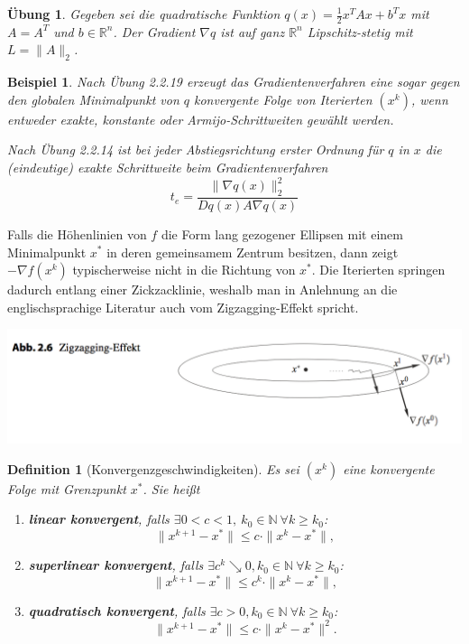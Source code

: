 \documentclass[11pt]{scrreprt}
\newcounter{thm}
\theoremstyle{thmstyle}
\numberwithin{thm}{section}
\newtheorem{beispiel}[thm]{Beispiel}
\newtheorem{definition}[thm]{Definition}
\newtheorem{uebung}[thm]{Übung}
\begin{document}
\begin{uebung}
	Gegeben sei die quadratische Funktion $q(x) = \frac{1}{2} x^T A x + b^T x$ mit $A = A^T$ und $b \in \mathbb{R}^n$. Der Gradient $\nabla q$ ist auf ganz $\mathbb{R}^n$ Lipschitz-stetig mit $L = \| A \|_2$. 
\end{uebung}

\begin{beispiel}
	Nach Übung 2.2.19 erzeugt das Gradientenverfahren eine sogar gegen den globalen Minimalpunkt von $q$ konvergente Folge von Iterierten $(x^k)$, wenn entweder exakte, konstante oder Armijo-Schrittweiten gewählt werden. ~\bigskip
	
	Nach Übung 2.2.14 ist bei jeder Abstiegsrichtung erster Ordnung für $q$ in $x$ die (eindeutige) exakte Schrittweite beim Gradientenverfahren 
	$$ t_e = \frac{\| \nabla q(x) \|_2^2}{D q(x) A \nabla q(x)} $$
\end{beispiel}

Falls die Höhenlinien von $f$ die Form lang gezogener Ellipsen mit einem Minimalpunkt $x^*$ in deren gemeinsamem Zentrum besitzen, dann zeigt $-\nabla f(x^k)$ typischerweise nicht in die Richtung von $x^*$. Die Iterierten springen dadurch entlang einer Zickzacklinie, weshalb man in Anlehnung an die englischsprachige Literatur auch vom Zigzagging-Effekt spricht.

\begin{center}
	\includegraphics[scale=0.5]{img/ab26}
\end{center}

\begin{definition}[Konvergenzgeschwindigkeiten]
	Es sei $(x^k)$ eine konvergente Folge mit Grenzpunkt $x^*$. Sie heißt
	\begin{enumerate}[label=\alph*\upshape)]
		\item \textbf{linear konvergent}, falls $\exists 0 < c < 1, ~ k_0 \in \mathbb{N} ~\forall k \geq k_0$: $$ \| x^{k+1} - x^*\| \leq c \cdot \| x^k - x^* \|, $$
		\item \textbf{superlinear konvergent}, falls $\exists c^k \searrow 0, k_0 \in \mathbb{N} ~\forall k \geq k_0$: $$ \| x^{k+1} - x^*\| \leq c^k \cdot \| x^k- x^* \|, $$
		\item \textbf{quadratisch konvergent}, falls $\exists c > 0, k_0 \in \mathbb{N} ~\forall k \geq k_0$: $$ \| x^{k+1} - x^* \| \leq c \cdot \| x^k - x^* \|^2. $$
	\end{enumerate}
\end{definition}
\end{document}

